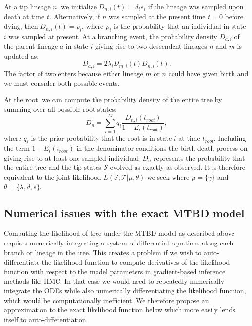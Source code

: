 \documentclass[10pt]{article}
\begin{document}
At a tip lineage $n$, we initialize $D_{n,i}(t) = d_{i} s_{i}$ if the lineage was sampled upon death at time $t$. Alternatively, if $n$ was sampled at the present time $t=0$ before dying, then $D_{n,i}(t) = \rho_{i}$, where $\rho_{i}$ is the probability that an individual in state $i$ was sampled at present. At a branching event, the probability density $D_{a,i}$ of the parent lineage $a$ in state $i$ giving rise to two descendent lineages $n$ and $m$ is updated as:
\begin{equation} \label{pruning}
	D_{a,i} = 2 \lambda_{i} D_{m,i}(t) D_{n,i}(t).
\end{equation}  
The factor of two enters because either lineage $m$ or $n$ could have given birth and we must consider both possible events.

At the root, we can compute the probability density of the entire tree by summing over all possible root states:
\begin{equation} \label{rootDensity}
	D_{n} = \sum_{i=1}^{M} q_{i} \frac{D_{n,i}(t_{root})}{1 - E_{i}(t_{root})}, 
\end{equation}
where $q_{i}$ is the prior probability that the root is in state $i$ at time $t_{root}$. Including the term $1 - E_{i}(t_{root})$ in the denominator conditions the birth-death process on giving rise to at least one sampled individual.  $D_{n}$ represents the probability that the entire tree and the tip states $\mathcal{S}$ evolved as exactly as observed. It is therefore equivalent to the joint likelihood $L(\mathcal{S}, \mathcal{T} | \mu, \theta)$ we seek where $\mu = \{\gamma\}$ and $\theta = \{\lambda, d, s\}$.

\subsection*{Numerical issues with the exact MTBD model}

Computing the likelihood of tree under the MTBD model as described above requires numerically integrating a system of differential equations along each branch or lineage in the tree. This creates a problem if we wish to auto-differentiate the likelihood function to compute derivatives of the likelihood function with respect to the model parameters in gradient-based inference methods like HMC. In that case we would need to repeatedly numerically integrate the ODEs while also numerically differentiating the likelihood function, which would be computationally inefficient. We therefore propose an approximation to the exact likelihood function below which more easily lends itself to auto-differentiation. 
\end{document}
